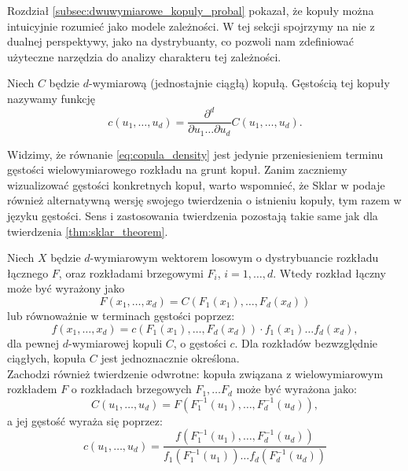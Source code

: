 Rozdział \ref{subsec:dwuwymiarowe_kopuly_probal} pokazał, że kopuły można intuicyjnie rozumieć jako modele zależności. W tej sekcji spojrzymy na nie z dualnej perspektywy, jako na dystrybuanty, co pozwoli nam zdefiniować użyteczne narzędzia do analizy charakteru tej zależności.

\begin{df}
	Niech $C$ będzie $d$-wymiarową (jednostajnie ciągłą) kopułą. Gęstością tej kopuły nazywamy funkcję
	\begin{equation}
		c(u_1, \dots, u_d) = \frac{\partial^d}{\partial u_1\dots \partial u_d}C(u_1, \dots, u_d).
		\label{eq:copula_density}
	\end{equation}
\end{df}


Widzimy, że równanie \ref{eq:copula_density} jest jedynie przeniesieniem terminu gęstości wielowymiarowego rozkładu na grunt kopuł. Zanim zaczniemy wizualizować gęstości konkretnych kopuł, warto wspomnieć, że Sklar w \cite{Sklar_Theorem} podaje również alternatywną wersję swojego twierdzenia o istnieniu kopuły, tym razem w języku gęstości. Sens i zastosowania twierdzenia pozostają takie same jak dla twierdzenia \ref{thm:sklar_theorem}.
\begin{thm}
	Niech $X$ będzie $d$-wymiarowym wektorem losowym o dystrybuancie rozkładu łącznego $F$, oraz rozkładami brzegowymi $F_i$, $i=1, \dots, d$. Wtedy rozkład łączny może być wyrażony jako		$$F(x_1, \dots, x_d) = C(F_1(x_1), \dots, F_d(x_d))$$
	lub równoważnie w terminach gęstości poprzez:
	$$ f(x_1, \dots, x_d) = c(F_1(x_1), \dots, F_d(x_d))\cdot f_1(x_1)\dots f_d(x_d),$$
	dla pewnej $d$-wymiarowej kopuli $C$, o gęstości $c$. Dla rozkładów bezwzględnie ciągłych, kopuła $C$ jest jednoznacznie określona.\\
	Zachodzi również twierdzenie odwrotne: kopuła związana z wielowymiarowym rozkładem $F$ o rozkładach brzegowych $F_1, \dots F_d$ może być wyrażona jako:
	$$C(u_1, \dots, u_d) = F(F_1^{-1}(u_1), \dots, F_d^{-1}(u_d)),$$
	a jej gęstość wyraża się poprzez:
	$$c(u_1, \dots, u_d) = \frac{f(F_1^{-1}(u_1), \dots, F_d^{-1}(u_d))}{f_1(F_1^{-1}(u_1))\dots f_d(F_d^{-1}(u_d))}$$
	\label{thm:sklar_theorem_density}
\end{thm}

